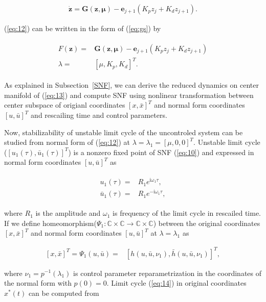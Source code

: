 \documentclass[openacc]{rsproca_new}%
\def\complex{\mathbb{C}}
\def\vec#1{\ensuremath{\mathbf{#1}}}
\newcommand{\Eref}[1]{(\ref{#1})}
\newcommand{\Ssref}[1]{Subsection~\ref{#1}}
\begin{document}
\begin{align}\label{eq:12}
    \dot{\vec{z}} =\vec{G}(\vec{z},\vec{\mu})-\vec{e}_{j+1}(K_p z_j+K_d z_{j+1}).
\end{align}

\noindent \Eref{eq:12} can be written in the form of \Eref{eq:gs} by

\begin{align}\label{eq:13}
\begin{split}
  F({\vec{z}})=&\vec{G}(\vec{z},\vec{\mu})-\vec{e}_{j+1}(K_pz_j+K_d z_{j+1})\\
  \lambda=&[\mu,K_p,K_d]^T.
\end{split}
\end{align}

\noindent As explained in \Ssref{SNF}, we can derive the reduced dynamics on center manifold of \Eref{eq:13} and compute SNF using nonlinear transformation between center subspace of origianl coordinates $[x,\bar x]^T$ and normal form coordinates $[u,\bar u]^T$ and rescailing time and control parameters.

Now, stabilizability of unstable limit cycle of the uncontroled system can be studied from normal form of \Eref{eq:12} at $\lambda=\lambda_1=[\mu,0,0]^T$. Unstable limit cycle ($[u_1(\tau),\bar u_1(\tau)]^T$) is a nonzero fixed point of SNF \Eref{eq:10} and expressed in normal form coordinates $[u,\bar u]^T$ as

\begin{align}\label{eq:14}
  \begin{split}
      u_1(\tau)=&R_1e^{\textrm{i}\omega_1 \tau},\\
      \bar u_1(\tau)=&R_1e^{-\textrm{i}\omega_1 \tau},
    \end{split}
\end{align}

\noindent where $R_1$ is the amplitude and $\omega_1$ is frequency of the limit cycle in rescailed time. If we define homeomorphism($\Psi_1:\complex\times\complex\rightarrow\complex\times\complex$) between the original coordinates $[x,\bar x]^T$ and normal form coordinates $[u,\bar u]^T$ at $\lambda=\lambda_1$ as

\begin{align}\label{eq:15}
    [x,\bar x]^T=\Psi_1(u,\bar u)=&[h(u,\bar u,\nu_1),\bar h(u,\bar u,\nu_1)]^T,
\end{align}

\noindent  where $\nu_1=p^{-1}(\lambda_1)$ is control parameter reparametrization in the coordinates of the normal form with $p(0)=0$. Limit cycle \Eref{eq:14} in original coordinates $x^*(t)$ can be computed from
\end{document}
